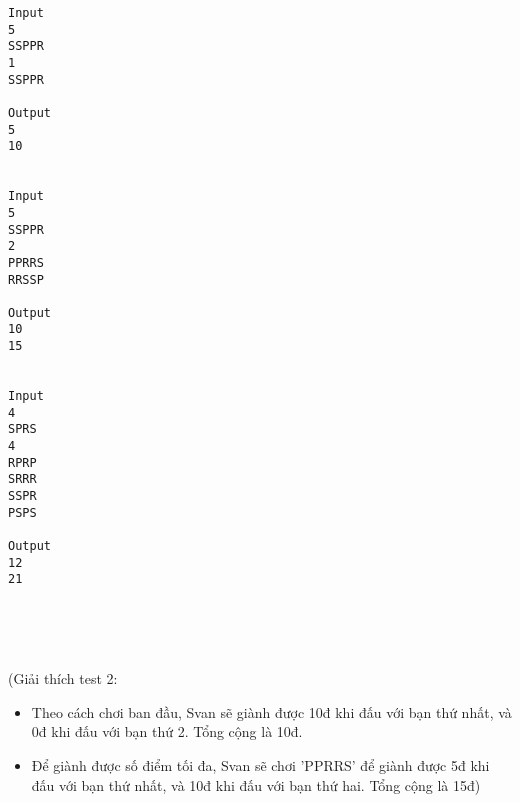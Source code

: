 \begin{verbatim}
Input
5
SSPPR
1
SSPPR

Output
5
10


Input
5
SSPPR
2
PPRRS
RRSSP

Output
10
15


Input
4
SPRS
4
RPRP
SRRR
SSPR
PSPS

Output
12
21
\end{verbatim}

 

 

(Giải thích test 2:
\begin{itemize}
	\item Theo cách chơi ban đầu, Svan sẽ giành được 10đ khi đấu với bạn thứ nhất, và 0đ khi đấu với bạn thứ 2. Tổng cộng là 10đ.
	\item Để giành được số điểm tối đa, Svan sẽ chơi 'PPRRS' để giành được 5đ khi đấu với bạn thứ nhất, và 10đ khi đấu với bạn thứ hai. Tổng cộng là 15đ)
\end{itemize}

 